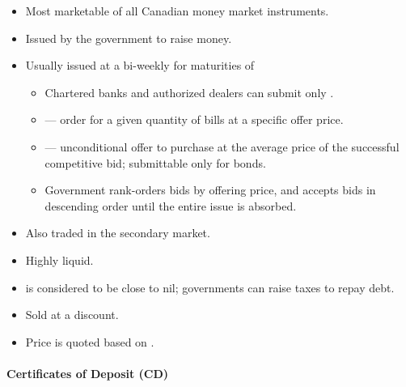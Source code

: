 \documentclass[notoc,notitlepage]{tufte-book}
\begin{document}
\begin{itemize}
  \item Most marketable of all Canadian money market instruments.
  \item Issued by the government to raise money.
  \item Usually issued at a bi-weekly  for maturities of
    \begin{itemize}
      \item Chartered banks and authorized dealers can submit
        only .
      \item {} --- order for a given quantity of bills
        at a specific offer price.
      \item {} ---
        unconditional offer to purchase at the average price
        of the successful competitive bid; submittable only for bonds.
      \item Government rank-orders bids by offering price,
        and accepts bids in descending order
        until the entire issue is absorbed.
    \end{itemize}
  \item Also traded in the secondary market.
  \item Highly liquid.
  \item {} is considered to be close to nil;
    governments can raise taxes to repay debt.
  \item Sold at a discount.
  \item Price is quoted based on .
\end{itemize}


\paragraph{Certificates of Deposit (CD)}\label{para:certificates_of_deposit}
\end{document}
